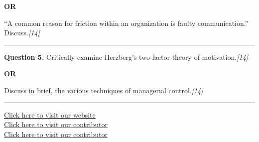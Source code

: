 \documentclass[11pt,a4paper]{article}
\newcommand{\pts}[1]{\hfill   \textit{[#1]}}
\begin{document}
\centerline{   \textbf{OR}}

``A common reason for friction within an organization is faulty communication.'' Discuss.\pts{14}

\medskip\rule{\linewidth}{0.2pt}




\noindent   \textbf{Question 5.}
Critically examine Herzberg's two-factor theory of motivation.\pts{14}

\centerline{   \textbf{OR}}

Discuss in brief, the various techniques of managerial control.\pts{14}

\vfill
\rule{\linewidth}{0.4pt}

\begin{center}\small
\href{https://bhu-exam.vercel.app/}{Click here to visit our website}\\[4pt]
\href{https://me-aryan.vercel.app/}{Click here to visit our contributor}\\[4pt]
\href{https://quashan-me.vercel.app/}{Click here to visit our contributor}
\end{center}
\end{document}

